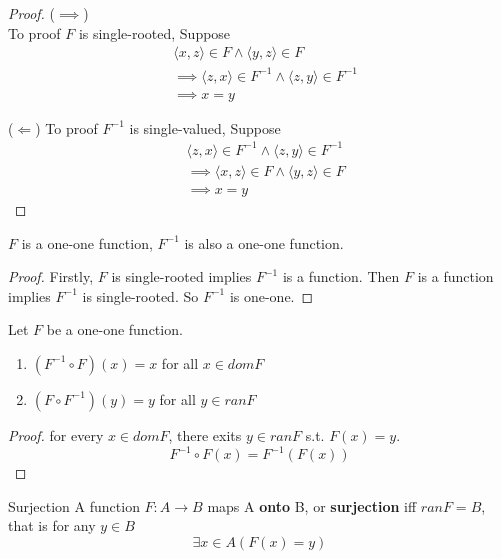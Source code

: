 \begin{proof}
  ($\implies $)\\
  To proof $F$ is single-rooted, Suppose
  \begin{align*}
    &\langle x,z \rangle \in F \land \langle y,z \rangle \in F\\
    &\implies \langle z,x \rangle \in F^{-1} \land \langle z,y
    \rangle \in F^{-1} \\
    &\implies x = y
  \end{align*}

  ($\Leftarrow $)
  To proof $F^{-1}$ is single-valued, Suppose
  \begin{align*}
    &\langle z,x\rangle \in F^{-1} \land \langle z,y \rangle \in F^{-1}\\
    &\implies \langle x,z \rangle \in F \land \langle y,z \rangle \in F\\
    &\implies x = y
  \end{align*}
\end{proof}

\begin{corollary}{}{}
  $F$ is a one-one function, $F^{-1}$ is also a one-one function.
\end{corollary}

\begin{proof}
  Firstly, $F$ is single-rooted implies $F^{-1}$ is a function. Then
  $F$ is a function implies $F^{-1}$ is single-rooted. So $F^{-1}$ is one-one.
\end{proof}

\begin{theorem}{}{}
  Let $F$ be a one-one function.
  \begin{enumerate}

    \item $(F^{-1} \circ F)(x) = x$ for all $x \in domF$
    \item $(F \circ F^{-1})(y) = y$ for all $y \in ranF$

  \end{enumerate}
\end{theorem}

\begin{proof}
  for every $x \in domF$, there exits $y \in ranF$ s.t. $F(x) = y$.
  \begin{equation*}
    F^{-1} \circ F(x) = F^{-1}(F(x))
  \end{equation*}
\end{proof}

\begin{definition}{Surjection}{}
  A function $F : A \to B$ maps A \textbf{onto} B, or
  \textbf{surjection} iff $ranF = B$, that is for any $y \in B$
  \begin{equation*}
    \exists x \in A(F(x) = y)
  \end{equation*}
\end{definition}

